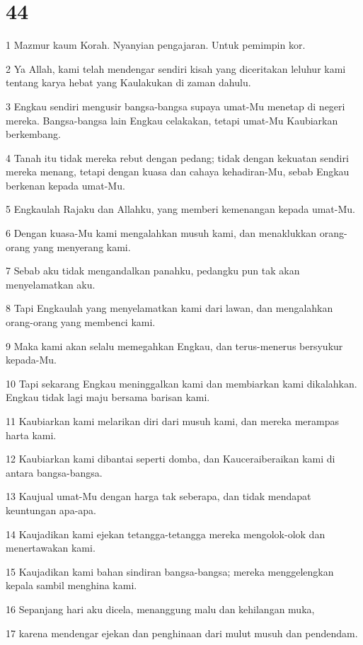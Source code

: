 \chapter{44}

\par 1 Mazmur kaum Korah. Nyanyian pengajaran. Untuk pemimpin kor.
\par 2 Ya Allah, kami telah mendengar sendiri kisah yang diceritakan leluhur kami tentang karya hebat yang Kaulakukan di zaman dahulu.
\par 3 Engkau sendiri mengusir bangsa-bangsa supaya umat-Mu menetap di negeri mereka. Bangsa-bangsa lain Engkau celakakan, tetapi umat-Mu Kaubiarkan berkembang.
\par 4 Tanah itu tidak mereka rebut dengan pedang; tidak dengan kekuatan sendiri mereka menang, tetapi dengan kuasa dan cahaya kehadiran-Mu, sebab Engkau berkenan kepada umat-Mu.
\par 5 Engkaulah Rajaku dan Allahku, yang memberi kemenangan kepada umat-Mu.
\par 6 Dengan kuasa-Mu kami mengalahkan musuh kami, dan menaklukkan orang-orang yang menyerang kami.
\par 7 Sebab aku tidak mengandalkan panahku, pedangku pun tak akan menyelamatkan aku.
\par 8 Tapi Engkaulah yang menyelamatkan kami dari lawan, dan mengalahkan orang-orang yang membenci kami.
\par 9 Maka kami akan selalu memegahkan Engkau, dan terus-menerus bersyukur kepada-Mu.
\par 10 Tapi sekarang Engkau meninggalkan kami dan membiarkan kami dikalahkan. Engkau tidak lagi maju bersama barisan kami.
\par 11 Kaubiarkan kami melarikan diri dari musuh kami, dan mereka merampas harta kami.
\par 12 Kaubiarkan kami dibantai seperti domba, dan Kauceraiberaikan kami di antara bangsa-bangsa.
\par 13 Kaujual umat-Mu dengan harga tak seberapa, dan tidak mendapat keuntungan apa-apa.
\par 14 Kaujadikan kami ejekan tetangga-tetangga mereka mengolok-olok dan menertawakan kami.
\par 15 Kaujadikan kami bahan sindiran bangsa-bangsa; mereka menggelengkan kepala sambil menghina kami.
\par 16 Sepanjang hari aku dicela, menanggung malu dan kehilangan muka,
\par 17 karena mendengar ejekan dan penghinaan dari mulut musuh dan pendendam.
